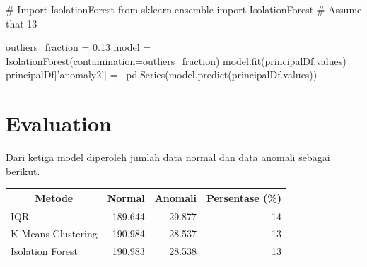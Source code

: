\begin{python}
# Import IsolationForest
from sklearn.ensemble import IsolationForest
# Assume that 13%
    
outliers_fraction = 0.13
model =  IsolationForest(contamination=outliers_fraction)
model.fit(principalDf.values) 
principalDf['anomaly2'] = \
    pd.Series(model.predict(principalDf.values))
\end{python}

    \section{Evaluation}

    Dari ketiga model diperoleh jumlah data normal dan data anomali sebagai berikut.

    \begin{table}[h]
        \centering
        \begin{tabular}{|l|r|r|r|}
            \hline
            \multicolumn{1}{|c|}{\textbf{Metode}} & \multicolumn{1}{c|}{\textbf{Normal}} & \multicolumn{1}{c|}{\textbf{Anomali}} & \multicolumn{1}{c|}{\textbf{Persentase (\%)}} \\ \hline
            IQR                & 189.644 & 29.877 & 14 \\ \hline
            K-Means Clustering & 190.984 & 28.537 & 13 \\ \hline
            Isolation Forest   & 190.983 & 28.538 & 13 \\ \hline
        \end{tabular}
    \end{table}
